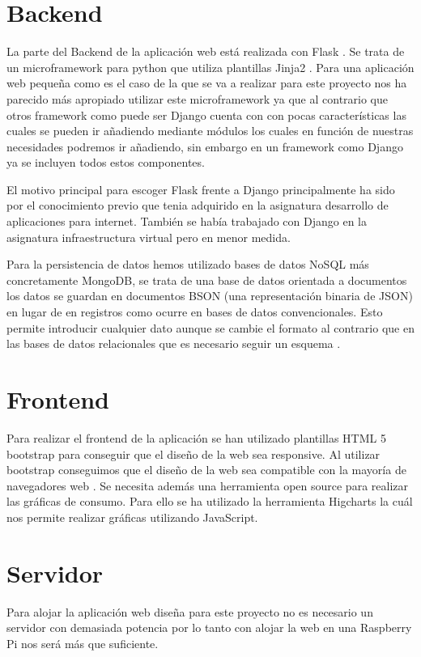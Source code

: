 \section{Backend}
La parte del Backend de la aplicación web está realizada con Flask \cite{Flask}. Se trata de un microframework para python que utiliza plantillas Jinja2 \cite{jinja2info}. Para una aplicación web pequeña como es el caso de la que se va a realizar para este proyecto nos ha parecido más apropiado utilizar este microframework ya que al contrario que otros framework como puede ser Django cuenta con con pocas características las cuales se pueden ir añadiendo mediante módulos los cuales en función de nuestras necesidades podremos ir añadiendo, sin embargo en un framework como Django \cite{Django} ya se incluyen todos estos componentes.

El motivo principal para escoger Flask frente a Django principalmente ha sido por el conocimiento previo que tenia adquirido en la asignatura desarrollo de aplicaciones para internet. También se había trabajado con Django en la asignatura infraestructura virtual pero en menor medida.

Para la persistencia de datos hemos utilizado bases de datos NoSQL más concretamente MongoDB, se trata de una base de datos orientada a documentos los datos se guardan en documentos BSON (una representación binaria de JSON) en lugar de en registros como ocurre en bases de datos convencionales. Esto permite introducir cualquier dato aunque se cambie el formato al contrario que en las bases de datos relacionales que es necesario seguir un esquema \cite{MongoDB}.

\section{Frontend}
Para realizar el frontend de la aplicación se han utilizado plantillas HTML 5 bootstrap para conseguir que el diseño de la web sea responsive. Al utilizar bootstrap conseguimos que el diseño de la web sea compatible con la mayoría de navegadores web \cite{Bootstrap}.
Se necesita además una herramienta open source para realizar las gráficas de consumo. Para ello se ha utilizado la herramienta Higcharts la cuál nos permite realizar gráficas utilizando JavaScript.

\section{Servidor}
Para alojar la aplicación web diseña para este proyecto no es necesario un servidor con demasiada potencia por lo tanto con alojar la web en una Raspberry Pi nos será más que suficiente.

